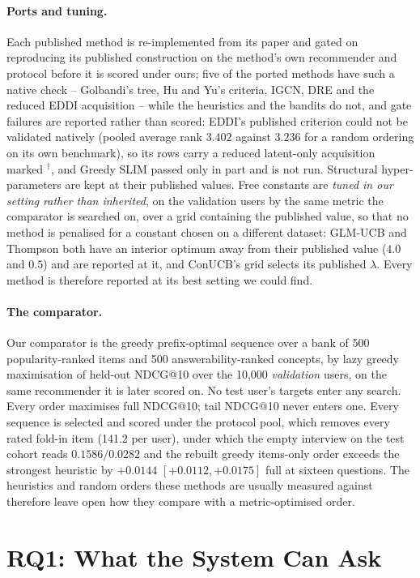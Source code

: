 \documentclass[runningheads]{llncs}
\begin{document}
\paragraph{Ports and tuning.}
Each published method is re-implemented from its paper and gated on reproducing its published
construction on the method's own recommender and protocol before it is scored under ours; five of
the ported methods have such a native check -- Golbandi's tree, Hu and Yu's criteria, IGCN, DRE and
the reduced EDDI acquisition -- while the heuristics and the bandits do not, and gate failures are
reported rather than scored: EDDI's published criterion could not be validated natively (pooled average rank $3.402$
against $3.236$ for a random ordering on its own benchmark), so its rows carry a reduced latent-only
acquisition marked $^\dagger$, and Greedy SLIM passed only in part and is not run.
Structural hyper-parameters are kept at their published values. Free constants are \emph{tuned in
our setting rather than inherited}, on the validation users by the same metric the comparator is
searched on, over a grid containing the published value, so that no method is penalised for a
constant chosen on a different dataset: GLM-UCB and Thompson both have an interior optimum away from
their published value ($4.0$ and $0.5$) and are reported at it, and ConUCB's grid selects its
published $\lambda$. Every method is therefore reported at its best setting we could find.

\paragraph{The comparator.}
Our comparator is the greedy prefix-optimal sequence over a bank of 500 popularity-ranked items and
500 answerability-ranked concepts, by lazy greedy maximisation of held-out NDCG@10 over the 10{,}000
\emph{validation} users, on the same recommender it is later scored on. No test user's targets enter
any search. Every order maximises full NDCG@10; tail NDCG@10 never enters one. Every sequence is
selected and scored under the protocol pool, which removes every rated fold-in item (141.2 per user),
under which the empty interview on the test cohort reads $0.1586/0.0282$ and the rebuilt greedy
items-only order exceeds the strongest heuristic by $+0.0144$ $[+0.0112,+0.0175]$ full at sixteen
questions. The heuristics and random orders these methods are usually measured against therefore
leave open how they compare with a metric-optimised order.

\section{RQ1: What the System Can Ask}
\label{sec:rq1}
\end{document}
